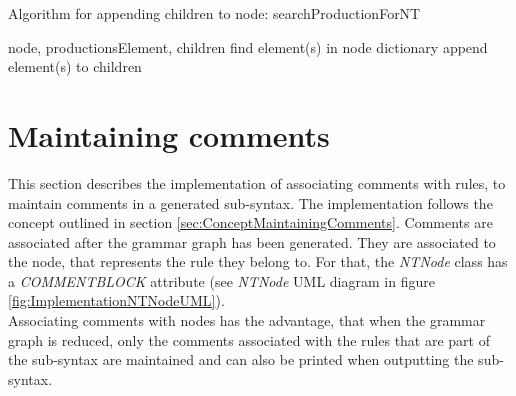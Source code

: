 \begin{algorithm}[H]
\caption{Algorithm for appending children to node: searchProductionForNT}
\begin{algorithmic}[1] 
\Require node, productionsElement, children
		\State find element(s) in node dictionary
		\State append element(s) to children
	\EndIf
\EndFor
\end{algorithmic}
\end{algorithm}

\section{Maintaining comments}\label{sec:ImplementationMaintainingComments}
This section describes the implementation of associating comments with rules, to maintain comments in a generated sub-syntax.
The implementation follows the concept outlined in section \ref{sec:ConceptMaintainingComments}.
Comments are associated after the grammar graph has been generated.
They are associated to the node, that represents the rule they belong to.
For that, the \textit{NTNode} class has a \textit{COMMENT\textunderscore BLOCK} attribute (see \textit{NTNode} UML diagram in figure \ref{fig:ImplementationNTNodeUML}).\\
Associating comments with nodes has the advantage, that when the grammar graph is reduced, only the comments associated with the rules that are part of the sub-syntax are maintained and can also be printed when outputting the sub-syntax.\\

